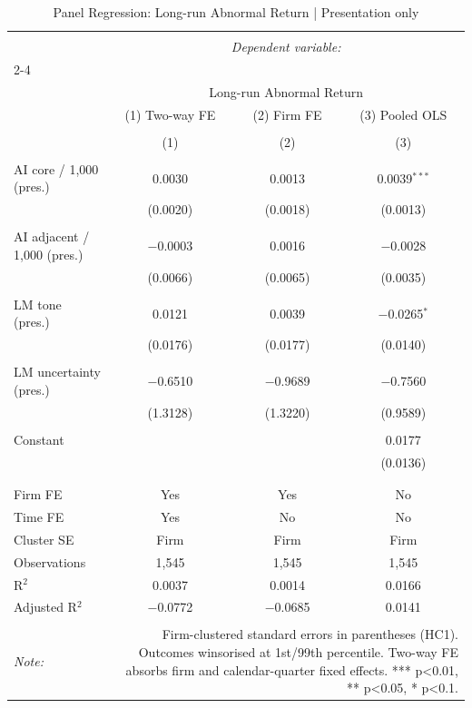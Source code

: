 
\begin{table}[!htbp] \centering 
  \caption{Panel Regression: Long-run Abnormal Return  |  Presentation only} 
  \label{} 
\begin{tabular}{@{\extracolsep{5pt}}lccc} 
\\[-1.8ex]\hline 
\hline \\[-1.8ex] 
 & \multicolumn{3}{c}{\textit{Dependent variable:}} \\ 
\cline{2-4} 
\\[-1.8ex] & \multicolumn{3}{c}{Long-run Abnormal Return} \\ 
 & (1) Two-way FE & (2) Firm FE & (3) Pooled OLS \\ 
\\[-1.8ex] & (1) & (2) & (3)\\ 
\hline \\[-1.8ex] 
 AI core / 1,000 (pres.) & 0.0030 & 0.0013 & 0.0039$^{***}$ \\ 
  & (0.0020) & (0.0018) & (0.0013) \\ 
  & & & \\ 
 AI adjacent / 1,000 (pres.) & $-$0.0003 & 0.0016 & $-$0.0028 \\ 
  & (0.0066) & (0.0065) & (0.0035) \\ 
  & & & \\ 
 LM tone (pres.) & 0.0121 & 0.0039 & $-$0.0265$^{*}$ \\ 
  & (0.0176) & (0.0177) & (0.0140) \\ 
  & & & \\ 
 LM uncertainty (pres.) & $-$0.6510 & $-$0.9689 & $-$0.7560 \\ 
  & (1.3128) & (1.3220) & (0.9589) \\ 
  & & & \\ 
 Constant &  &  & 0.0177 \\ 
  &  &  & (0.0136) \\ 
  & & & \\ 
\hline \\[-1.8ex] 
Firm FE & Yes & Yes & No \\ 
Time FE & Yes & No & No \\ 
Cluster SE & Firm & Firm & Firm \\ 
Observations & 1,545 & 1,545 & 1,545 \\ 
R$^{2}$ & 0.0037 & 0.0014 & 0.0166 \\ 
Adjusted R$^{2}$ & $-$0.0772 & $-$0.0685 & 0.0141 \\ 
\hline 
\hline \\[-1.8ex] 
\textit{Note:}  & \multicolumn{3}{r}{Firm-clustered standard errors in parentheses (HC1). Outcomes winsorised at 1st/99th percentile. Two-way FE absorbs firm and calendar-quarter fixed effects. *** p<0.01, ** p<0.05, * p<0.1.} \\ 
\end{tabular} 
\end{table} 
